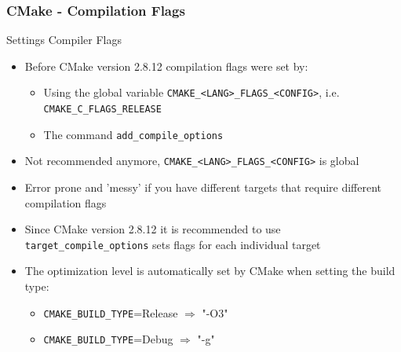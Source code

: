 \begin{frame}
  \frametitle{CMake - Compilation Flags}
  \begin{block}{Settings Compiler Flags}
    \begin{itemize}
      \item Before CMake version 2.8.12 compilation flags were set by:
      \begin{itemize}
        \item Using the global variable \texttt{CMAKE\_<LANG>\_FLAGS\_<CONFIG>}, i.e. \texttt{CMAKE\_C\_FLAGS\_RELEASE}  
        \item The command \texttt{add\_compile\_options}
      \end{itemize}
    \item Not recommended anymore, \texttt{CMAKE\_<LANG>\_FLAGS\_<CONFIG>} is global
    \item Error prone and 'messy' if you have different targets that require different compilation flags
    \item Since CMake version 2.8.12 it is recommended to use \texttt{target\_compile\_options} sets flags for each individual target
    \item The optimization level is automatically set by CMake when setting the build type:
      \begin{itemize}
        \item \texttt{CMAKE\_BUILD\_TYPE}=Release $\Longrightarrow$ "-O3"
        \item \texttt{CMAKE\_BUILD\_TYPE}=Debug $\Longrightarrow$ "-g"
      \end{itemize}
    \end{itemize}
  \end{block}
\end{frame}

